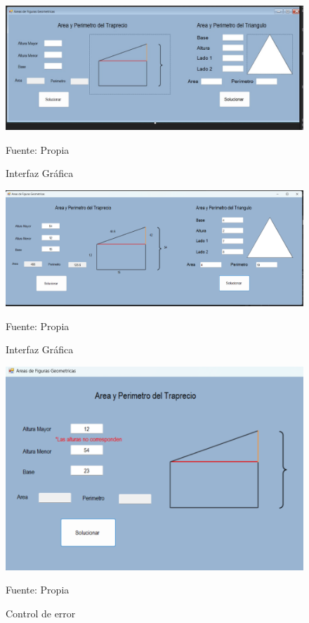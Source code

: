 \begin{figure}[H]
  \centering
  \includegraphics[scale = 0.5]{Imagenes/interfaz_grafica.jpeg}
  \caption{Interfaz Gráfica}{Fuente: Propia}
\end{figure}

\begin{figure}[H]
  \centering
  \includegraphics[scale = 0.5]{Imagenes/i2.png}
  \caption{Interfaz Gráfica}{Fuente: Propia}
\end{figure}


\begin{figure}[H]
  \centering
  \includegraphics[scale = 0.75]{Imagenes/i3.png}
  \caption{Control de error}{Fuente: Propia}
\end{figure}